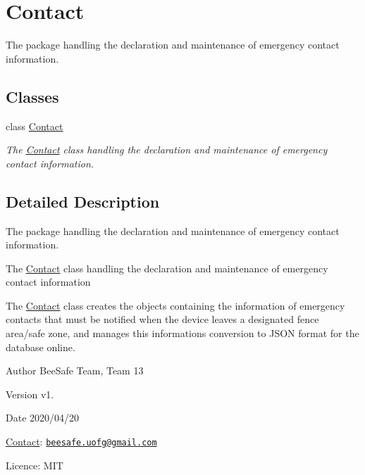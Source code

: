 \hypertarget{group___contact}{}\section{Contact}
\label{group___contact}


The package handling the declaration and maintenance of emergency contact information.  


\subsection*{Classes}
\begin{DoxyCompactItemize}
\item 
class \hyperlink{class_contact}{Contact}
\begin{DoxyCompactList}\small\item\em The \hyperlink{class_contact}{Contact} class handling the declaration and maintenance of emergency contact information. \end{DoxyCompactList}\end{DoxyCompactItemize}


\subsection{Detailed Description}
The package handling the declaration and maintenance of emergency contact information. 

The \hyperlink{class_contact}{Contact} class handling the declaration and maintenance of emergency contact information

The \hyperlink{class_contact}{Contact} class creates the objects containing the information of emergency contacts that must be notified when the device leaves a designated fence area/safe zone, and manages this information\textquotesingle{}s conversion to J\+S\+ON format for the database online.

\begin{DoxyAuthor}{Author}
Bee\+Safe Team, Team 13
\end{DoxyAuthor}
\begin{DoxyVersion}{Version}
v1.
\end{DoxyVersion}
\begin{DoxyDate}{Date}
2020/04/20
\end{DoxyDate}
\hyperlink{class_contact}{Contact}\+: \href{mailto:beesafe.uofg@gmail.com}{\tt beesafe.\+uofg@gmail.\+com}

Licence\+: M\+IT 